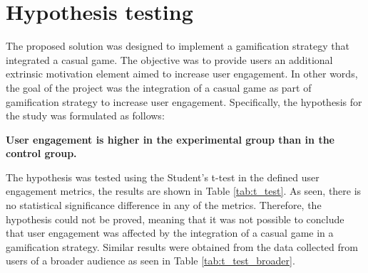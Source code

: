 \section{Hypothesis testing}
The proposed solution was designed to implement a gamification strategy that integrated a casual game. The objective was to provide users an additional extrinsic motivation element aimed to increase user engagement. In other words, the goal of the project was the integration of a casual game as part of gamification strategy to increase user engagement. Specifically, the hypothesis for the study was formulated as follows:

\begin{displayquote}
\textbf{User engagement is higher in the experimental group than in the control group.}
\end{displayquote}

The hypothesis was tested using the Student's t-test in the defined user engagement metrics, the results are shown in Table \ref{tab:t_test}. As seen, there is no statistical significance difference in any of the metrics. Therefore, the hypothesis could not be proved, meaning that it was not possible to conclude that user engagement was affected by the integration of a casual game in a gamification strategy. Similar results were obtained from the data collected from users of a broader audience as seen in Table \ref{tab:t_test_broader}.

